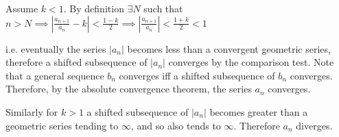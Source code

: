 \documentclass[12pt]{article}
\begin{document}
Assume $k < 1$. By definition $\exists N$ such that \newline $n > N \implies |\frac{a_{n+1}}{a_n} - k| < \frac{1-k}{2} \implies |\frac{a_{n+1}}{a_n}| < \frac{1+k}{2} < 1$


i.e. eventually the series $|a_n|$ becomes less than a convergent geometric series, therefore a shifted subsequence of $|a_n|$ converges by the comparison test. Note that a general sequence $b_n$ converges iff a shifted subsequence of $b_n$ converges. Therefore, by the absolute convergence theorem, the series $a_n$ converges.

Similarly for $k > 1$ a shifted subsequence of $|a_n|$ becomes greater than a geometric series tending to $\infty$, and so also tends to $\infty$. Therefore $a_n$ diverges.
\end{document}
